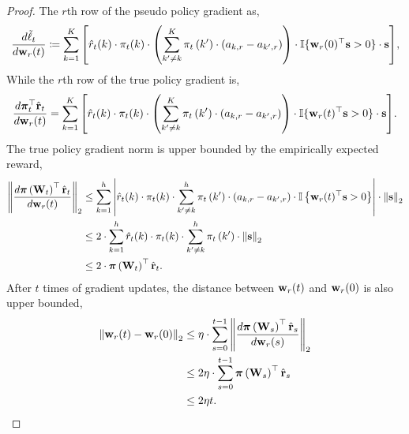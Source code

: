 \begin{proof}
The $r$th row of the pseudo policy gradient as,
\begin{equation*}
	\frac{d \tilde{\ell}_t}{d {\mathbf{w}}_r(t)} \coloneqq \sum\limits_{k=1}^{K}{ \left[ \hat{r}_{t}(k) \cdot \pi_{t}(k) \cdot \left( \sum\limits_{k^\prime \not= k}^{K}{ \pi_{t}\left(k^\prime\right) \cdot \left( a_{k,r} - a_{k^\prime,r} \right)  } \right) \cdot {\mathbb{I}}\{ {\mathbf{w}}_r(0)^\top {\mathbf{s}} > 0 \} \cdot {\mathbf{s}} \right] },
\end{equation*}
While the $r$th row of the true policy gradient is,
\begin{equation*}
	\frac{d {\boldsymbol{\pi}}_t^\top \hat{{\mathbf{r}}}_t}{d {\mathbf{w}}_r(t)} = \sum\limits_{k=1}^{K}{ \left[\hat{r}_{t}(k) \cdot \pi_{t}(k) \cdot \left( \sum\limits_{k^\prime \not= k}^{K}{ \pi_{t}\left(k^\prime\right) \cdot \left( a_{k,r} - a_{k^\prime,r} \right)  } \right) \cdot {\mathbb{I}}\{ {\mathbf{w}}_r(t)^\top {\mathbf{s}} > 0 \} \cdot {\mathbf{s}} \right] }.
\end{equation*}
The true policy gradient norm is upper bounded by the empirically expected reward,
\begin{equation*}
\begin{split}
	\left\| \frac{d {\boldsymbol{\pi}}\left( {\mathbf{W}}_t \right)^\top \hat{{\mathbf{r}}}_t}{d {\mathbf{w}}_r(t)} \right\|_2 &\le \sum\limits_{k=1}^{h}{ \left|\hat{r}_{t}(k) \cdot \pi_{t}(k) \cdot \sum\limits_{k^\prime \not= k}^{h}{ \pi_{t}\left(k^\prime\right) \cdot \left( a_{k,r} - a_{k^\prime,r} \right)  } \cdot {\mathbb{I}}\left\{ {\mathbf{w}}_r(t)^\top {\mathbf{s}} > 0 \right\} \right| \cdot \left\| {\mathbf{s}} \right\|_2 } \\
	&\le 2 \cdot \sum\limits_{k=1}^{h}{\hat{r}_{t}(k) \cdot \pi_{t}(k) \cdot \sum\limits_{k^\prime \not= k}^{h}{ \pi_{t}\left(k^\prime\right)  } \cdot \left\| {\mathbf{s}} \right\|_2  } \\
	&\le 2 \cdot {\boldsymbol{\pi}}\left({\mathbf{W}}_t\right)^\top \hat{{\mathbf{r}}}_t.
\end{split}
\end{equation*}
After $t$ times of gradient updates, the distance between ${\mathbf{w}}_r(t)$ and ${\mathbf{w}}_r(0)$ is also upper bounded,
\begin{equation*}
\begin{split}
	\left\| \rvw_r(t) - \rvw_r(0) \right\|_2 &\le \eta \cdot \sum\limits_{s=0}^{t-1}{\left\| \frac{d \rvpi\left( \rmW_s \right)^\top \hat{\rvr}_s}{d \rvw_r(s)} \right\|_2} \\
	&\le 2 \eta \cdot \sum\limits_{s=0}^{t-1}{ \rvpi\left(\rmW_s\right)^\top \hat{\rvr}_s } \\
	&\le 2 \eta t .
\end{split}

\end{equation*}
\end{proof}
